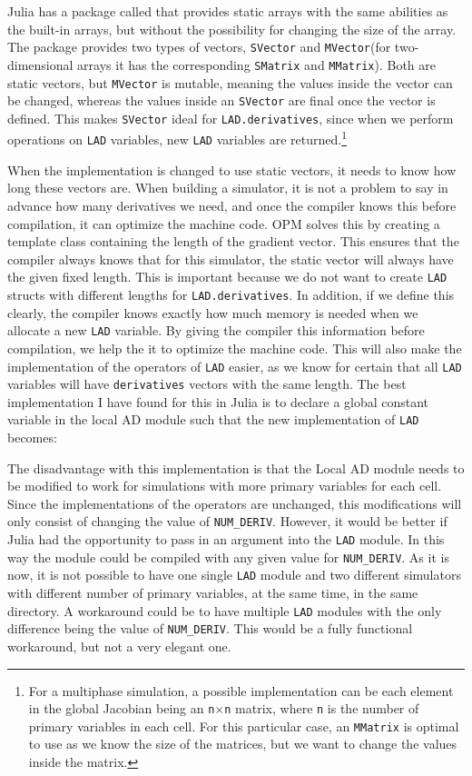 Julia has a package called \emph{\cite{StaticArrays}} that provides static arrays with the same abilities as the built-in arrays, but without the possibility for changing the size of the array. The package provides two types of vectors, \texttt{SVector} and \texttt{MVector}(for two-dimensional arrays it has the corresponding \texttt{SMatrix} and \texttt{MMatrix}). Both are static vectors, but \texttt{MVector} is mutable, meaning the values inside the vector can be changed, whereas the values inside an \texttt{SVector} are final once the vector is defined. This makes \texttt{SVector} ideal for \texttt{LAD.derivatives}, since when we perform operations on \texttt{LAD} variables, new \texttt{LAD} variables are returned.\footnote{For a multiphase simulation, a possible implementation can be each element in the global Jacobian being an \texttt{n}$\times$\texttt{n} matrix, where \texttt{n} is the number of primary variables in each cell. For this particular case, an \texttt{MMatrix} is optimal to use as we know the size of the matrices, but we want to change the values inside the matrix.} 

When the implementation is changed to use static vectors, it needs to know how long these vectors are. When building a simulator, it is not a problem to say in advance how many derivatives we need, and once the compiler knows this before compilation, it can optimize the machine code. OPM solves this by creating a template class containing the length of the gradient vector. This ensures that the compiler always knows that for this simulator, the static vector will always have the given fixed length. This is important because we do not want to create \texttt{LAD} structs with different lengths for \texttt{LAD.derivatives}. In addition, if we define this clearly, the compiler knows exactly how much memory is needed when we allocate a new \texttt{LAD} variable. By giving the compiler this information before compilation, we help the it to optimize the machine code. This will also make the implementation of the operators of \texttt{LAD} easier, as we know for certain that all \texttt{LAD} variables will have \texttt{derivatives} vectors with the same length. The best implementation I have found for this in Julia is to declare a global constant variable in the local AD module such that the new implementation of \texttt{LAD} becomes:

The disadvantage with this implementation is that the Local AD module needs to be modified to work for simulations with more primary variables for each cell. Since the implementations of the operators are unchanged, this modifications will only consist of changing the value of \texttt{NUM\_DERIV}. However, it would be better if Julia had the opportunity to pass in an argument into the \texttt{LAD} module. In this way the module could be compiled with any given value for \texttt{NUM\_DERIV}. As it is now, it is not possible to have one single \texttt{LAD} module and two different simulators with different number of primary variables, at the same time, in the same directory. A workaround could be to have multiple \texttt{LAD} modules with the only difference being the value of \texttt{NUM\_DERIV}. This would be a fully functional workaround, but not a very elegant one.

